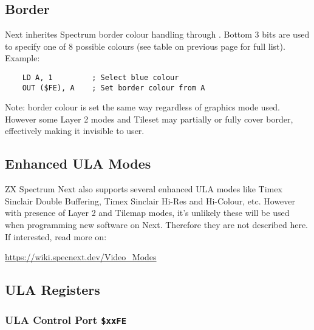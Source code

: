 \documentclass[12pt,twoside,openright,a4paper]{book}
\begin{document}
\subsection{Border}

Next inherites Spectrum border colour handling through . Bottom 3 bits are used to specify one of 8 possible colours (see table on previous page for full list). Example:

\begin{lstlisting}
	LD A, 1			; Select blue colour
	OUT ($FE), A	; Set border colour from A
\end{lstlisting}

Note: border colour is set the same way regardless of graphics mode used. However some Layer 2 modes and Tileset may partially or fully cover border, effectively making it invisible to user.

\subsection{Enhanced ULA Modes}

ZX Spectrum Next also supports several enhanced ULA modes like Timex Sinclair Double Buffering, Timex Sinclair Hi-Res and Hi-Colour, etc. However with presence of Layer 2 and Tilemap modes, it's unlikely these will be used when programming new software on Next. Therefore they are not described here. If interested, read more on:

\url{https://wiki.specnext.dev/Video_Modes}


\subsection{ULA Registers}

\subsubsection{ULA Control Port {\tt \$xxFE}}

\begin{NextPort}
\end{NextPort}
\end{document}

